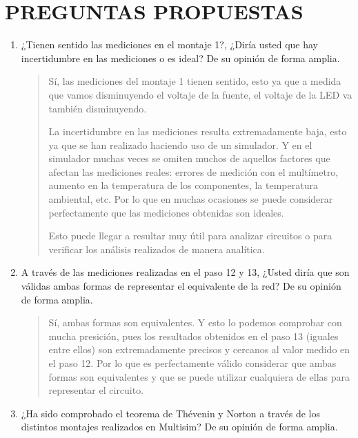 \documentclass{article}
\begin{document}
    \section{PREGUNTAS PROPUESTAS}

    \begin{enumerate}[label=\alph*.-]
        \item ¿Tienen sentido las mediciones en el montaje 1?, ¿Diría usted que hay incertidumbre en las mediciones o es ideal? De su opinión de forma amplia.
        
        \begin{quote}
            Sí, las mediciones del montaje 1 tienen sentido, esto ya que a medida que vamos disminuyendo el voltaje de la fuente, el voltaje de la LED va también disminuyendo.

            La incertidumbre en las mediciones resulta extremadamente baja, esto ya que se han realizado haciendo uso de un simulador. Y en el simulador muchas veces se omiten muchos de aquellos factores que afectan las mediciones reales: errores de medición con el multímetro, aumento en la temperatura de los componentes, la temperatura ambiental, etc. Por lo que en muchas ocasiones se puede considerar perfectamente que las mediciones obtenidas son ideales.

            Esto puede llegar a resultar muy útil para analizar circuitos o para verificar los análisis realizados de manera analítica.
        \end{quote}

        \item A través de las mediciones realizadas en el paso 12 y 13, ¿Usted diría que son válidas ambas formas de representar el equivalente de la red? De su opinión de forma amplia.
        
        \begin{quote}
            Sí, ambas formas son equivalentes. Y esto lo podemos comprobar con mucha presición, pues los resultados obtenidos en el paso 13 (iguales entre ellos) son extremadamente precisos y cercanos al valor medido en el paso 12. Por lo que es perfectamente válido considerar que ambas formas son equivalentes y que se puede utilizar cualquiera de ellas para representar el circuito.
        \end{quote}

        \item ¿Ha sido comprobado el teorema de Thévenin y Norton a través de los distintos montajes realizados en Multisim? De su opinión de forma amplia.
        

\end{enumerate}
\end{document}
